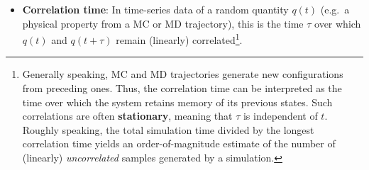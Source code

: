 \begin{itemize}
  



\item {\bf Correlation time}: In time-series data of a random quantity $q(t)$ (e.g.\ a physical property from a MC or MD trajectory), this is the time $\tau$ over which $q(t)$ and $q(t+\tau)$ remain (linearly) correlated\footnote{Generally speaking, MC and MD trajectories generate new configurations from preceding ones.
Thus, the correlation time can be interpreted as the time over which the system retains memory of its previous states.
Such correlations are often {\bf stationary}, meaning that $\tau$ is independent of $t$.
Roughly speaking, the total simulation time divided by the longest correlation time yields an order-of-magnitude estimate of the number of (linearly) {\it uncorrelated} samples generated by a simulation.}.
\label{def:corr_time}

%



\end{itemize}
